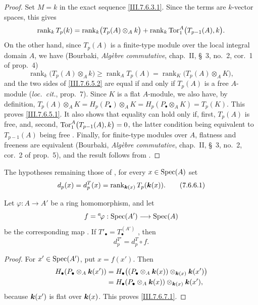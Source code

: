 \begin{proof}
Set $M=k$ in the exact sequence \eqref{III.7.6.3.1}.  Since
the terms are $k$-vector spaces, this gives
\[
  \operatorname{rank}_k T_p(k)
  =
  \operatorname{rank}_k\bigl(T_p(A)\otimes_A k\bigr)
  +
  \operatorname{rank}_k
  \operatorname{Tor}_1^A\bigl(T_{p-1}(A),k\bigr).
\]
On the other hand, since $T_p(A)$ is a finite-type module
over the local integral domain $A$, we have (Bourbaki,
\emph{Alg\`ebre commutative}, chap.~II, \S~3, no.~2,
cor.~1 of prop.~4)
\[
  \operatorname{rank}_k\bigl(T_p(A)\otimes_A k\bigr)
  \geq
  \operatorname{rank}_A T_p(A)
  =
  \operatorname{rank}_K\bigl(T_p(A)\otimes_A K\bigr),
  \tag{7.6.5.2}\label{III.7.6.5.2}
\]
and the two sides of \eqref{III.7.6.5.2} are equal if and
only if $T_p(A)$ is a free $A$-module (\emph{loc.\ cit.},
prop.~7).  Since $K$ is a flat $A$-module, we also have, by
definition, $T_p(A)\otimes_A K=H_p(P_\bullet)\otimes_A K=H_p(P_\bullet\otimes_A K)=T_p(K)$.
This proves \eqref{III.7.6.5.1}.  It also shows that equality
can hold only if, first, $T_p(A)$ is free, and, second, $\operatorname{Tor}_1^A\bigl(T_{p-1}(A),k\bigr)=0$,
the latter condition being equivalent to $T_{p-1}(A)$ being
free .  Finally, for finite-type modules
over $A$, flatness and freeness are equivalent (Bourbaki,
\emph{Alg\`ebre commutative}, chap.~II, \S~3, no.~2,
cor.~2 of prop.~5), and the result follows from
.
\end{proof}

\begin{env}[7.6.6]
\label{III.7.6.6}
The hypotheses remaining those of , for
every $x\in\operatorname{Spec}(A)$ set
\[
  d_p(x)=d_p^T(x)
  =
  \operatorname{rank}_{\boldsymbol{k}(x)}T_p(\boldsymbol{k}(x)).
  \tag{7.6.6.1}\label{III.7.6.6.1}
\]
\end{env}

\begin{lemma}[7.6.7]
\label{III.7.6.7}
Let $\varphi:A\to A'$ be a ring homomorphism, and let
\[
  f={}^a\!\varphi:\operatorname{Spec}(A')\longrightarrow\operatorname{Spec}(A)
\]
be the corresponding map .  If
$T'_\bullet=T_\bullet^{(A')}$ , then
\[
  d_p^{T'}=d_p^T\circ f.
  \tag{7.6.7.1}\label{III.7.6.7.1}
\]
\end{lemma}

\begin{proof}
For $x'\in\operatorname{Spec}(A')$, put $x=f(x')$.  Then
\begin{align*}
  H_\bullet(P_\bullet\otimes_A\boldsymbol{k}(x'))
  &=
  H_\bullet\bigl(
    (P_\bullet\otimes_A\boldsymbol{k}(x))
    \otimes_{\boldsymbol{k}(x)}\boldsymbol{k}(x')
  \bigr)\\
  &=
  H_\bullet(P_\bullet\otimes_A\boldsymbol{k}(x))
  \otimes_{\boldsymbol{k}(x)}\boldsymbol{k}(x'),
\end{align*}
because $\boldsymbol{k}(x')$ is flat over $\boldsymbol{k}(x)$.  This proves
\eqref{III.7.6.7.1}.
\end{proof}

